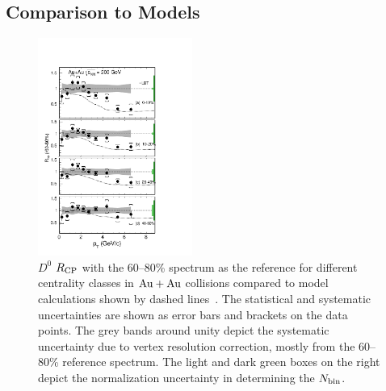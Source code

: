 \documentclass[%
 reprint,	
 amsmath,amssymb,
 aps,
 prc,
]{revtex4-1}
\begin{document}



\subsection{\label{result:theory}Comparison to Models}

\begin{figure}
\centering
\includegraphics[width=0.45\textwidth]{fig/D0_Rcp11.pdf}
\caption{$D^{0}$ $R_{\rm CP}$ with the 60--80\% spectrum as the reference for different centrality classes in ${\rm{Au + Au}}$ collisions compared to model calculations shown by dashed lines~\cite{Cao:2016gvr,LBT:private}. The statistical and systematic uncertainties are shown as error bars and brackets on the data points. The grey bands around unity depict the systematic uncertainty due to vertex resolution correction, mostly from the 60--80\% reference spectrum. The light and dark green boxes on the right depict the normalization uncertainty in determining the $N_{\rm bin}$.}
\label{fig:D0_Rcp11} 
\end{figure}
\end{document}
